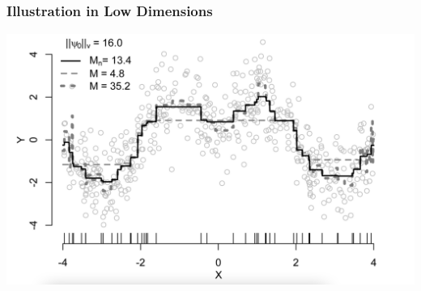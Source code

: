 \documentclass[t]{beamer}
\begin{document}
\begin{frame}
\frametitle{Illustration in Low Dimensions}
\vspace{-5pt}
\begin{center}
\includegraphics[width=1.1\textwidth]{figures/HAL-univariate.png}
\end{center}
\end{frame}
\end{document}
